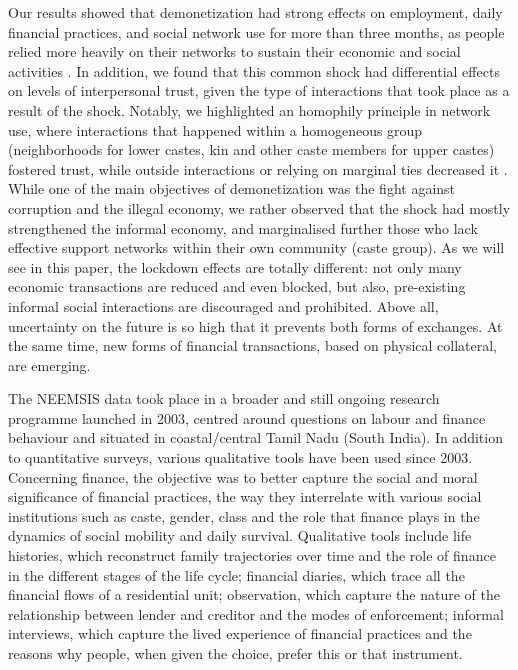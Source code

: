 \documentclass[a4paper, 11pt, onecolumn]{article}
\begin{document}
Our results showed that demonetization had strong effects on employment, daily financial practices, and social network use for more than three months, as people relied more heavily on their networks to sustain their economic and social activities \citep{Guerin2017}. 
In addition, we found that this common shock had differential effects on levels of interpersonal trust, given the type of interactions that took place as a result of the shock. 
Notably, we highlighted an homophily principle in network use, where interactions that happened within a homogeneous group (neighborhoods for lower castes, kin and other caste members for upper castes) fostered trust, while outside interactions or relying on marginal ties decreased it \citep{Hilger2020}. 
While one of the main objectives of demonetization was the fight against corruption and the illegal economy, we rather observed that the shock had mostly strengthened the informal economy, and marginalised further those who lack effective support networks within their own community (caste group). 
As we will see in this paper, the lockdown effects are totally different: not only many economic transactions are reduced and even blocked, but also, pre-existing informal social interactions are discouraged and prohibited. 
Above all, uncertainty on the future is so high that it prevents both forms of exchanges. 
At the same time, new forms of financial transactions, based on physical collateral, are emerging.

The NEEMSIS data took place in a broader and still ongoing research programme launched in 2003, centred around questions on labour and finance behaviour and situated in coastal/central Tamil Nadu (South India).
In addition to quantitative surveys, various qualitative tools have been used since 2003. 
Concerning finance, the objective was to better capture the social and moral significance of financial practices, the way they interrelate with various social institutions such as caste, gender, class and the role that finance plays in the dynamics of social mobility and daily survival. 
Qualitative tools include life histories, which reconstruct family trajectories over time and the role of finance in the different stages of the life cycle; financial diaries, which trace all the financial flows of a residential unit; observation, which capture the nature of the relationship between lender and creditor and the modes of enforcement; informal interviews, which capture the lived experience of financial practices and the reasons why people, when given the choice, prefer this or that instrument. 
\end{document}
